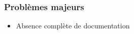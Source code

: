 \documentclass{beamer}
\begin{document}
\begin{frame}
    \frametitle{Problèmes majeurs}

    \begin{itemize}
        \item Absence complète de documentation %
    \end{itemize}   
\end{frame}    
\end{document}
